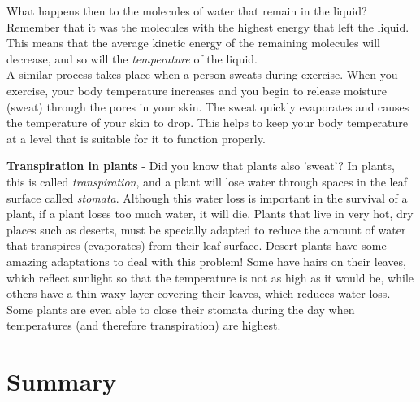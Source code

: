 \begin{itemize}
{What happens then to the molecules of water that remain in the liquid? Remember that it was the molecules with the highest energy that left the liquid. This means that the average kinetic energy of the remaining molecules will decrease, and so will the \textit{temperature} of the liquid.\\

A similar process takes place when a person sweats during exercise. When you exercise, your body temperature increases and you begin to release moisture (sweat) through the pores in your skin. The sweat quickly evaporates and causes the temperature of your skin to drop. This helps to keep your body temperature at a level that is suitable for it to function properly.}
\end{itemize}

\begin{IFact}{\textbf{Transpiration in plants} - Did you know that plants also 'sweat'? In plants, this is called \textit{transpiration}, and a plant will lose water through spaces in the leaf surface called \textit{stomata}. Although this water loss is important in the survival of a plant, if a plant loses too much water, it will die. Plants that live in very hot, dry places such as deserts, must be specially adapted to reduce the amount of water that transpires (evaporates) from their leaf surface. Desert plants have some amazing adaptations to deal with this problem! Some have hairs on their leaves, which reflect sunlight so that the temperature is not as high as it would be, while others have a thin waxy layer covering their leaves, which reduces water loss. Some plants are even able to close their stomata during the day when temperatures (and therefore transpiration) are highest.}
\end{IFact}


\section{Summary}

